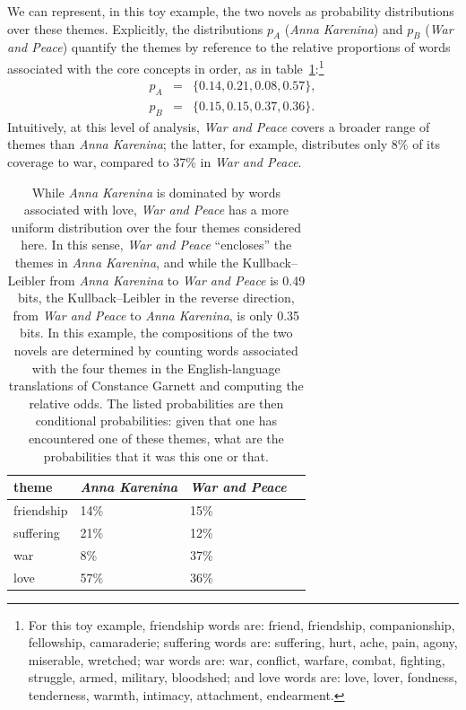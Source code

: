 We can represent, in this toy example, the two novels as probability distributions over these themes. Explicitly, the distributions $p_A$ (\emph{Anna Karenina}) and $p_B$ (\emph{War and Peace}) quantify the themes by reference to the relative proportions of words associated with the core concepts in order, as in table~\ref{tab:novelthemes}:\footnote{For this toy example, friendship words are: friend, friendship, companionship, fellowship, camaraderie; suffering words are: suffering, hurt, ache, pain, agony, miserable, wretched; war words are: war, conflict, warfare, combat, fighting, struggle, armed, military, bloodshed; and love words are: love, lover, fondness, tenderness, warmth, intimacy, attachment, endearment.}
\begin{eqnarray*}
p_A & =  & \{0.14, 0.21, 0.08, 0.57\}, \\
p_B & =  & \{0.15, 0.15, 0.37, 0.36 \}.
\end{eqnarray*}
Intuitively, at this level of analysis, \emph{War and Peace} covers a broader range of themes than \emph{Anna Karenina}; the latter, for example, distributes only 8\% of its coverage to war, compared to 37\% in \emph{War and Peace}.

\begin{table}[H]%
  \fontsize{12}{12}\selectfont
  \centering
  \begin{tabular}{@{}llll@{}}
    \toprule
    theme      & \emph{Anna Karenina} & \emph{War and Peace} \\
    \midrule
    friendship & 14\%    & 15\% \\
    suffering  & 21\%    & 12\% \\
    war        & 8\%     & 37\% \\
    love       & 57\%    & 36\% \\
    \bottomrule
  \end{tabular}
  \caption{While \emph{Anna Karenina} is dominated by words associated with love, \emph{War and Peace} has a more uniform distribution over the four themes considered here. In this sense, \emph{War and Peace} ``encloses'' the themes in \emph{Anna Karenina}, and while the Kullback--Leibler from \emph{Anna Karenina} to \emph{War and Peace} is 0.49 bits, the Kullback--Leibler in the reverse direction, from \emph{War and Peace} to \emph{Anna Karenina}, is only 0.35 bits. In this example, the compositions of the two novels are determined by counting words associated with the four themes in the English-language translations of Constance Garnett and computing the relative odds. The listed probabilities are then conditional probabilities: given that one has encountered one of these themes, what are the probabilities that it was this one or that.}\label{tab:novelthemes}
\end{table}



